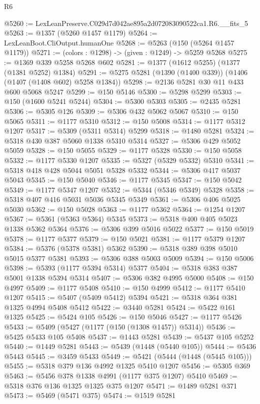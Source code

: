 \begin{lexlean}{R6}
\begin{coremodule}
@5260 := LexLeanPreserve.C029d7d042ae895a2d072083090522ca1.R6.__fits_5
@5263 := @1357 (@5260 @1457 @1179)
@5264 := LexLeanBoot.CliOutput.humanOne
@5268 := @5263 (@150 (@5264 @1457 @1179))
@5271 := (colors : @1298) -> (given : @1249) -> @5259 @5268
@5275 := @1369 @339 @5258 @5268 @602
@5281 := @1377 (@1612 @5255) (@1377 (@1381 @5252) @1384)
@5291 := @5275 @5281 (@1390 (@1400 @339)) (@1406 (@1407 (@1408 @602) @5258 @1384))
@5298 := @2136 @5281 @30 @11 @433 @600 @5068 @5247
@5299 := @150 @5146
@5300 := @5298 @5299
@5303 := @150 (@1600 @5241 @5244)
@5304 := @5300 @5303
@5305 := @2435 @5281
@5306 := @5305 @126
@5309 := @5306 @432 @5062 @5067
@5310 := @150 @5065
@5311 := @1177 @5310
@5312 := @150 @5008
@5314 := @1177 @5312 @1207
@5317 := @5309 (@5311 @5314) @5299
@5318 := @1480 @5281
@5324 := @5318 @430 @387 @5060 @1338 @5310 @5314
@5327 := @5306 @429 @5052 @5059
@5328 := @150 @5055
@5329 := @1177 @5328
@5330 := @150 @5058
@5332 := @1177 @5330 @1207
@5335 := @5327 (@5329 @5332) @5310
@5341 := @5318 @418 @428 @5044 @5051 @5328 @5332
@5344 := @5306 @417 @5037 @5043
@5345 := @150 @5040
@5346 := @1177 @5345
@5347 := @150 @5042
@5349 := @1177 @5347 @1207
@5352 := @5344 (@5346 @5349) @5328
@5358 := @5318 @407 @416 @5031 @5036 @5345 @5349
@5361 := @5306 @406 @5025 @5030
@5362 := @150 @5028
@5363 := @1177 @5362
@5364 := @1254 @1207
@5367 := @5361 (@5363 @5364) @5345
@5373 := @5318 @400 @405 @5023 @1338 @5362 @5364
@5376 := @5306 @399 @5016 @5022
@5377 := @150 @5019
@5378 := @1177 @5377
@5379 := @150 @5021
@5381 := @1177 @5379 @1207
@5384 := @5376 (@5378 @5381) @5362
@5390 := @5318 @389 @398 @5010 @5015 @5377 @5381
@5393 := @5306 @388 @5003 @5009
@5394 := @150 @5006
@5398 := @5393 (@1177 @5394 @5314) @5377
@5404 := @5318 @383 @387 @5001 @1338 @5394 @5314
@5407 := @5306 @382 @4995 @5000
@5408 := @150 @4997
@5409 := @1177 @5408
@5410 := @150 @4999
@5412 := @1177 @5410 @1207
@5415 := @5407 (@5409 @5412) @5394
@5421 := @5318 @364 @381 @1325 @4994 @5408 @5412
@5422 := @3440 @5281
@5424 := @5422 @161 @1325
@5425 := @5424 @105
@5426 := @150 @5046
@5427 := @1177 @5426
@5433 := @5409 (@5427 (@1177 (@150 (@1308 @1457)) @5314))
@5436 := @5425 @5433 @105 @5408
@5437 := @1443 @5281
@5439 := @5437 @105 @5252
@5440 := @1449 @5281
@5443 := @5439 (@1448 (@5440 @105))
@5444 := @5436 @5443
@5445 := @3459 @5433
@5449 := @5421 (@5444 (@1448 (@5445 @105)))
@5455 := @5318 @379 @136 @4992 @1325 @5410 @1207
@5456 := @5305 @369
@5463 := @5456 @378 @1338 @4991 (@1177 @375 @1207) @5410
@5469 := @5318 @376 @136 @1325 @1325 @375 @1207
@5471 := @1489 @5281 @371
@5473 := @5469 (@5471 @375)
@5474 := @1519 @5281

\end{coremodule}
\end{lexlean}
